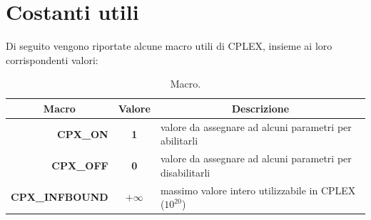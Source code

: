 \section{Costanti utili}
Di seguito vengono riportate alcune macro utili di CPLEX, insieme ai loro corrispondenti valori:
\begin{table}[h]
\footnotesize\centering
\begin{tabular}{rcl}
\hline
\multicolumn{1}{c}{\textbf{Macro}}&\multicolumn{1}{c}{\textbf{Valore}} &\multicolumn{1}{c}{\textbf{Descrizione}}\\
\hline
\textbf{CPX\_ON} & {\textbf{1}} & {valore da assegnare ad alcuni parametri per abilitarli}\\
\textbf{CPX\_OFF} & {\textbf{0}} & {valore da assegnare ad alcuni parametri per disabilitarli}\\
\textbf{CPX\_INFBOUND} & {$+\infty$ } & {massimo valore intero utilizzabile in CPLEX ($10^{20}$)}\\
\hline
\end{tabular}
\caption{Macro.}
\end{table}
